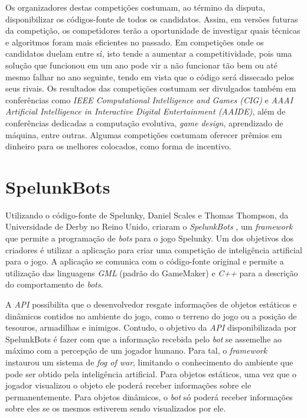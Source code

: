 Os organizadores destas competições costumam, ao término da disputa,
disponibilizar os códigos-fonte de todos os candidatos. Assim, em versões
futuras da competição, os competidores terão a oportunidade de investigar quais
técnicas e algoritmos foram mais eficientes no passado. Em competições onde os
candidatos duelam entre sí, isto tende a aumentar a competitividade, pois uma
solução que funcionou em um ano pode vir a não funcionar tão bem ou até mesmo
falhar no ano seguinte, tendo em vista que o código será dissecado pelos seus
rivais. Os resultados das competições costumam ser divulgados também em
conferências como \textit{IEEE Computational Intelligence and Games (CIG)} e
\textit{AAAI Artificial Intelligence in Interactive Digital Entertainment
(AAIDE)}, além de conferências dedicadas a computação evolutiva, \textit{game
design}, aprendizado de máquina, entre outras. Algumas competições costumam
oferecer prêmios em dinheiro para os melhores colocados, como forma de
incentivo.


\section{SpelunkBots}
Utilizando o código-fonte de Spelunky, Daniel Scales e Thomas Thompson, da
Universidade de Derby no Reino Unido, criaram o \textit{SpelunkBots}
\cite{SPELUNKBOTSWEB}, um \textit{framework} que permite a programação de
\textit{bots} para o jogo Spelunky. Um dos objetivos dos criadores é utilizar a
aplicação para criar uma competição de inteligência artificial para o jogo. A
aplicação se comunica com o código-fonte original e permite a utilização das
linguagens \textit{GML} (padrão do GameMaker) e \textit{C++} para a descrição
do comportamento de \textit{bots}.

A \textit{API} possibilita que o desenvolvedor resgate informações de objetos
estáticos e dinâmicos contidos no ambiente do jogo, como o terreno do jogo ou a
posição de tesouros, armadilhas e inimigos. Contudo, o objetivo da \textit{API}
disponibilizada por SpelunkBots é fazer com que a informação recebida pelo
\textit{bot} se assemelhe ao máximo com a percepção de um jogador humano.  Para
tal, o \textit{framework} instaurou um sistema de \textit{fog of war},
limitando o conhecimento do ambiente que pode ser obtido pela inteligência
artificial.  Para objetos estáticos, uma vez que o jogador visualizou o objeto
ele poderá receber informações sobre ele permanentemente. Para objetos
dinâmicos, o \textit{bot} só poderá receber informações sobre eles se os mesmos
estiverem sendo visualizados por ele.

